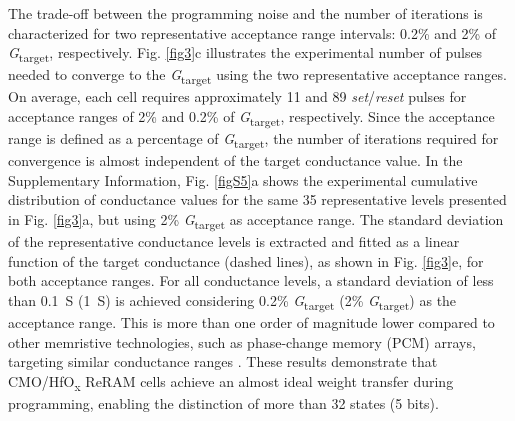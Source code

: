 The trade-off between the programming noise and the number of iterations is characterized for two representative acceptance range intervals: 0.2\% and 2\% of \textit{G}\textsubscript{\textnormal{target}}, respectively. Fig. \ref{fig3}c illustrates the experimental number of pulses needed to converge to the \textit{G}\textsubscript{\textnormal{target}} using the two representative acceptance ranges. On average, each cell requires approximately 11 and 89 \textit{set}/\textit{reset} pulses for acceptance ranges of 2\% and 0.2\% of \textit{G}\textsubscript{\textnormal{target}}, respectively. Since the acceptance range is defined as a percentage of \textit{G}\textsubscript{\textnormal{target}}, the number of iterations required for convergence is almost independent of the target conductance value. In the Supplementary Information, Fig. \ref{figS5}a shows the experimental cumulative distribution of conductance values for the same 35 representative levels presented in Fig. \ref{fig3}a, but using 2\% \textit{G}\textsubscript{\textnormal{target}} as acceptance range. The standard deviation of the representative conductance levels is extracted and fitted as a linear function of the target conductance (dashed lines), as shown in Fig. \ref{fig3}e, for both acceptance ranges. For all conductance levels, a standard deviation of less than 0.1~\textmu S (1~\textmu S) is achieved considering 0.2\% \textit{G}\textsubscript{\textnormal{target}} (2\% \textit{G}\textsubscript{\textnormal{target}}) as the acceptance range. This is more than one order of magnitude lower compared to other memristive technologies, such as phase-change memory (PCM) arrays, targeting similar conductance ranges \cite{Joshi2020, Tsai2019, LeGallo18}. These results demonstrate that CMO/HfO\textsubscript{\textnormal{x}} ReRAM cells achieve an almost ideal weight transfer during programming, enabling the distinction of more than 32 states (5 bits).

